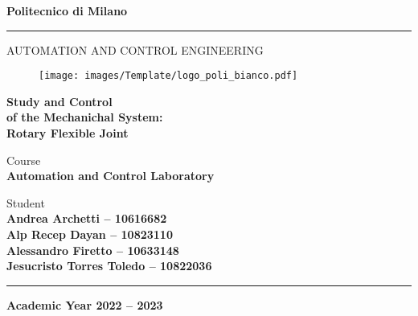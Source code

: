 \documentclass[a4paper,12pt,openright,notitlepage,oneside]{book}
\begin{document}
	\begin{titlepage}

		\begin{center}
			\Large{\textbf{Politecnico di Milano}} \\
			\vspace{-4mm}
			\rule{\textwidth}{0.4pt}
			\normalsize{AUTOMATION AND CONTROL ENGINEERING} \\
			\vspace{24mm}
			
			\begin{figure}[h!]
				\centering
				\texttt{[image: images/Template/logo\_poli\_bianco.pdf]}
			\end{figure}

			\vspace{25mm}

			\huge{\textbf{Study and Control}} \\
			\huge{\textbf{of the Mechanichal System:}} \\
			\huge{\textbf{Rotary Flexible Joint}} \\
			\vspace{15mm}
		\end{center}

		
		\begin{flushright}
			\normalsize{Course} \\
			\small{\textbf{Automation and Control Laboratory}} \\
		\end{flushright}

		\vspace{0.5mm}

		\begin{flushright}
			\normalsize{Student} \\
			\small{\textbf{Andrea Archetti -- 10616682}} \\
			\small{\textbf{Alp Recep Dayan -- 10823110}} \\
			\small{\textbf{Alessandro 	Firetto -- 10633148}} \\
			\small{\textbf{Jesucristo Torres Toledo -- 10822036}} \\
		\end{flushright}

		\begin{center}
			\rule{\textwidth}{0.4pt}
			\small{\textbf{Academic Year 2022 -- 2023}}
		\end{center}
	\end{titlepage}

	\mainmatter %

	\tableofcontents

	
	
	
	
	

	
\end{document}
